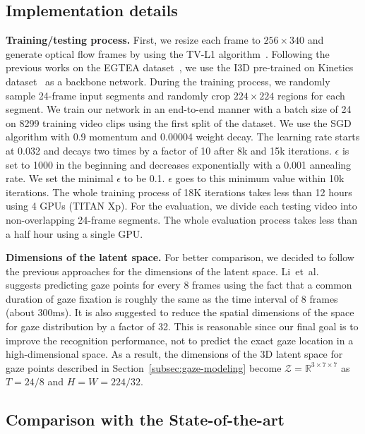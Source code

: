 \documentclass[10pt,twocolumn,letterpaper]{article}
\begin{document}
\subsection{Implementation details} \label{subsec:imp}
\textbf{Training/testing process. } First, we resize each frame to $256\times340$ and generate optical flow frames by using the TV-L1 algorithm~\cite{zach2007duality}. Following the previous works on the EGTEA dataset~\cite{huang2019mutual,li2018eye}, we use the I3D pre-trained on Kinetics dataset~\cite{carreira2017quo} as a backbone network. During the training process, we randomly sample 24-frame input segments and randomly crop $224\times224$ regions for each segment. We train our network in an end-to-end manner with a batch size of 24 on 8299 training video clips using the first split of the dataset. We use the SGD algorithm with 0.9 momentum and 0.00004 weight decay. The learning rate starts at 0.032 and decays two times by a factor of 10 after 8k and 15k iterations. $\epsilon$ is set to 1000 in the beginning and decreases exponentially with a 0.001 annealing rate. We set the minimal $\epsilon$ to be 0.1. $\epsilon$ goes to this minimum value within 10k iterations. The whole training process of 18K iterations takes less than 12 hours using 4 GPUs (TITAN Xp). For the evaluation, we divide each testing video into non-overlapping 24-frame segments. The whole evaluation process takes less than a half hour using a single GPU.

\textbf{Dimensions of the latent space. } For better comparison, we decided to follow the previous approaches for the dimensions of the latent space. Li~et~al.~\cite{li2018eye} suggests predicting gaze points for every 8 frames using the fact that a common duration of gaze fixation is roughly the same as the time interval of 8 frames (about 300ms). It is also suggested to reduce the spatial dimensions of the space for gaze distribution by a factor of 32. This is reasonable since our final goal is to improve the recognition performance, not to predict the exact gaze location in a high-dimensional space. As a result, the dimensions of the 3D latent space for gaze points described in Section~\ref{subsec:gaze-modeling} become $\mathcal{Z}=\mathbb{R}^{3 \times 7 \times 7}$ as $T=24/8$ and $H=W=224/32$.

\subsection{Comparison with the State-of-the-art} \label{subsec:comparison}
\end{document}
